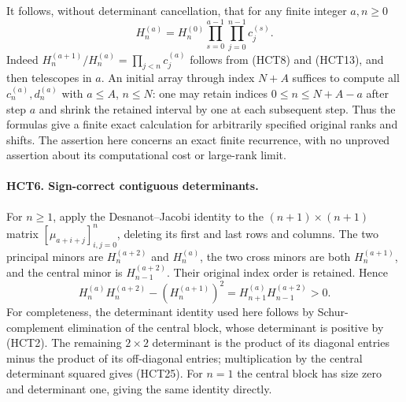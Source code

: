 It follows, without determinant cancellation, that for any finite
integer $a,n\geq0$
\begin{equation}\tag{HCT24}
 H_n^{(a)}=H_n^{(0)}
 \prod_{s=0}^{a-1}\prod_{j=0}^{n-1}c_j^{(s)}.
\end{equation}
Indeed $H_n^{(a+1)}/H_n^{(a)}=\prod_{j<n}c_j^{(a)}$ follows
from (HCT8) and (HCT13), and then telescopes in $a$.
An initial array through index $N+A$ suffices to compute all
$c_n^{(a)},d_n^{(a)}$ with $a\leq A$, $n\leq N$: one may
retain indices $0\leq n\leq N+A-a$ after step $a$ and shrink
the retained interval by one at each subsequent step.
Thus the formulas give a finite exact calculation for arbitrarily
specified original ranks and shifts. The assertion here concerns
an exact finite recurrence, with no unproved assertion about its
computational cost or large-rank limit.

\paragraph{HCT6. Sign-correct contiguous determinants.}
For $n\geq1$, apply the Desnanot--Jacobi identity to the
$(n+1)\times(n+1)$ matrix $[\mu_{a+i+j}]_{i,j=0}^{n}$,
deleting its first and last rows and columns. The two principal
minors are $H_n^{(a+2)}$ and $H_n^{(a)}$, the two cross minors
are both $H_n^{(a+1)}$, and the central minor is
$H_{n-1}^{(a+2)}$. Their original index order is retained. Hence
\begin{equation}\tag{HCT25}
 H_n^{(a)}H_n^{(a+2)}-(H_n^{(a+1)})^2
 =H_{n+1}^{(a)}H_{n-1}^{(a+2)}>0.
\end{equation}
For completeness, the determinant identity used here follows by
Schur-complement elimination of the central block, whose determinant
is positive by (HCT2). The remaining $2\times2$ determinant is
the product of its diagonal entries minus the product of its
off-diagonal entries; multiplication by the central determinant
squared gives (HCT25). For $n=1$ the central block has size zero
and determinant one, giving the same identity directly.

